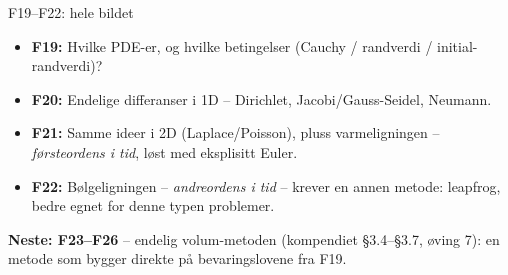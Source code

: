 \documentclass[11pt,aspectratio=169]{beamer}
\begin{document}
\begin{frame}{F19--F22: hele bildet}
\begin{nestefb}
\begin{itemize}
\item \textbf{F19:} Hvilke PDE-er, og hvilke betingelser (Cauchy / randverdi / initial-randverdi)?
\item \textbf{F20:} Endelige differanser i 1D -- Dirichlet, Jacobi/Gauss-Seidel, Neumann.
\item \textbf{F21:} Samme ideer i 2D (Laplace/Poisson), pluss varmeligningen -- \emph{førsteordens i tid}, løst med eksplisitt Euler.
\item \textbf{F22:} Bølgeligningen -- \emph{andreordens i tid} -- krever en annen metode: leapfrog, bedre egnet for denne typen problemer.
\end{itemize}
\end{nestefb}
\textbf{Neste: F23--F26} -- endelig volum-metoden (kompendiet §3.4--§3.7, øving 7): en metode som bygger direkte på bevaringslovene fra F19.
\end{frame}
\end{document}

